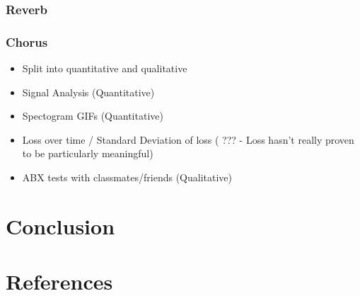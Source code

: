 \documentclass{l4proj}
\providecommand{\tightlist}{%
  \setlength{\itemsep}{0pt}\setlength{\parskip}{0pt}}
\begin{document}
\subsection{Reverb}\label{reverb}

\subsection{Chorus}\label{chorus}

\begin{itemize}
\tightlist
\item
  Split into quantitative and qualitative
\item
  Signal Analysis (Quantitative)
\item
  Spectogram GIFs (Quantitative)
\item
  Loss over time / Standard Deviation of loss ( ??? - Loss hasn't really
  proven to be particularly meaningful)
\item
  ABX tests with classmates/friends (Qualitative)
\end{itemize}

\chapter{Conclusion}\label{conclusion}

\chapter{References}\label{references}
\end{document}
